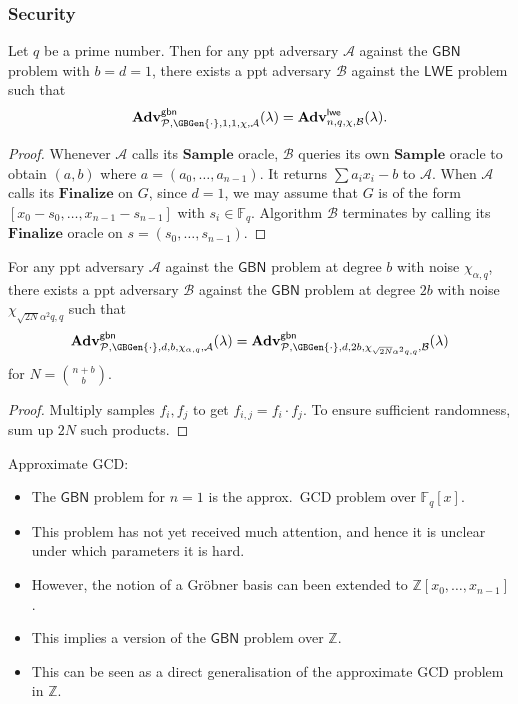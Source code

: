\documentclass[10pt]{beamer}
\newcommand{\field}[1]{\mathbb{#1}}
\newcommand{\F}{\field{F}}
\newcommand{\secpar}{\lambda}
\newcommand{\A}{\ensuremath{\mathcal{A}}\xspace}
\newcommand{\B}{\ensuremath{\mathcal{B}}\xspace}
\newcommand{\Finalize}{\mathbf{Finalize}}
\newcommand{\Sample}{\mathbf{Sample}}
\newcommand{\Adv}{\mathbf{Adv}}
\newcommand{\GBN}{\ensuremath{\mathsf{GBN}}\xspace}
\newcommand{\LWE}{\ensuremath{\mathsf{LWE}}\xspace}
\begin{document}
\begin{frame}[allowframebreaks]
\frametitle{Security}

\begin{lemma}[\LWE Hard $\Rightarrow$ \GBN Hard for $d=1,b=1$]
Let $q$ be a prime number. Then for any ppt adversary \A against the \GBN problem with $b=d=1$, there exists a ppt adversary $\B$ against the \LWE problem such that
\[
\Adv^{\mathsf{gbn}}_{\mathcal{P},\GBGen{\cdot},1,1,\chi,\A}(\secpar)  = \Adv^{\mathsf{lwe}}_{n,q,\chi,\B}(\secpar).
\]
\label{lem:GBN=LWE}
\end{lemma}

\begin{proof}
Whenever \A calls its $\Sample$ oracle, \B queries its own $\Sample$ oracle to obtain $(a, b)$ where $a = (a_0,\dots,a_{n-1})$. It returns $\sum a_ix_i - b$ to \A. When \A calls its $\Finalize$ on $G$, since $d=1$, we may assume that $G$ is of the form $[x_0 - s_0, \dots, x_{n-1} - s_{n-1}]$ with $s_i \in \F_q$. Algorithm \B terminates by calling its $\Finalize$ oracle on $s=(s_0,\dots,s_{n-1})$. 
\end{proof} 


\framebreak

\begin{lemma}[\GBN Hard for $2b$ $\Rightarrow$ \GBN Hard for $b$]
\label{lem:GBN-degrees}
For any ppt adversary $\A$ against the \GBN problem at degree $b$ with noise $\chi_{\alpha, q}$, there exists a ppt adversary $\B$ against the \GBN problem at degree $2b$ with noise $\chi_{\sqrt{2N} \alpha^2q, q}$ such that
\[
\Adv^{\mathsf{gbn}}_{\mathcal{P},\GBGen{\cdot},d,b,\chi_{\alpha, q},\A}(\secpar)  = \Adv^{\mathsf{gbn}}_{\mathcal{P},\GBGen{\cdot},d,2b,\chi_{\sqrt{2N} \alpha^2q, q},\B}(\secpar)
\]
for $N = {n + b \choose b}$. 
\end{lemma}

\begin{proof}
Multiply samples $f_i,f_j$  to get $f_{i,j} = f_i \cdot f_j$. To ensure sufficient randomness, sum up $2N$ such products.
\end{proof}

\framebreak

Approximate GCD:

\begin{itemize}
 \item The \GBN problem for $n=1$ is the approx.\ GCD problem over $\F_q[x]$. 
 \item This problem has not yet received much attention, and hence it is unclear under which parameters it is hard. 
 \item However, the notion of a Gröbner basis can been extended to $\mathbb{Z}[x_0,\dots,x_{n-1}]$.
 \item This implies a version of the \GBN problem over $\mathbb{Z}$. 
 \item This can be seen as a direct generalisation of the approximate GCD problem in $\mathbb{Z}$.
\end{itemize}


\end{frame}
\end{document}

